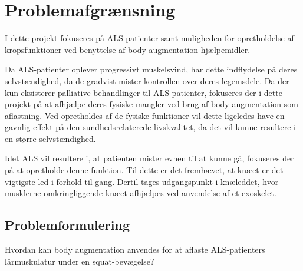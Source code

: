 \section{Problemafgrænsning}
I dette projekt fokuseres på ALS-patienter samt muligheden for opretholdelse af kropsfunktioner ved benyttelse af body augmentation-hjælpemidler. 

Da ALS-patienter oplever progressivt muskelsvind, har dette indflydelse på deres selvstændighed, da de gradvist mister kontrollen over deres legemsdele. Da der kun eksisterer palliative behandlinger til ALS-patienter, fokuseres der i dette projekt på at afhjælpe deres fysiske mangler ved brug af body augmentation som aflastning.
Ved opretholdes af de fysiske funktioner vil dette ligeledes have en gavnlig effekt på den sundhedsrelaterede livskvalitet, da det vil kunne resultere i en større selvstændighed.%

Idet ALS vil resultere i, at patienten mister evnen til at kunne gå, fokuseres der på at opretholde denne funktion. Til dette er det fremhævet, at knæet er det vigtigste led i forhold til gang. Dertil tages udgangspunkt i knæleddet, hvor musklerne omkringliggende knæet afhjælpes ved anvendelse af et exoskelet.

\subsection{Problemformulering}
Hvordan kan body augmentation anvendes for at aflaste ALS-patienters lårmuskulatur under en squat-bevægelse?